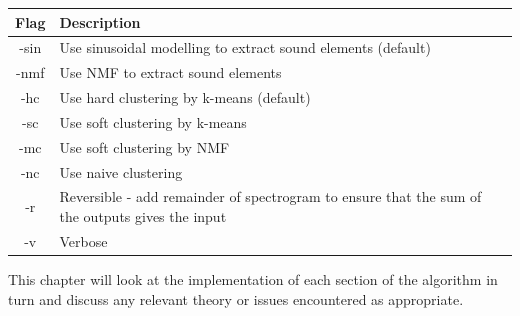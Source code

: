 \documentclass[12pt,a4paper,twoside,openright]{report}
\begin{document}
\begin{tabular}{c|p{130mm}}
Flag & Description \\ 
\hline -sin & Use sinusoidal modelling to extract sound elements (default) \\ 
-nmf & Use NMF to extract sound elements \\ 
-hc & Use hard clustering by k-means (default) \\ 
-sc & Use soft clustering by k-means \\ 
-mc & Use soft clustering by NMF \\ 
-nc & Use naive clustering \\ 
-r & Reversible - add remainder of spectrogram to ensure that the sum of the outputs gives the input \\ 
-v & Verbose \\ 
\end{tabular}

\bigskip

This chapter will look at the implementation of each section of the algorithm in turn and discuss any relevant theory or issues encountered as appropriate.
\end{document}
